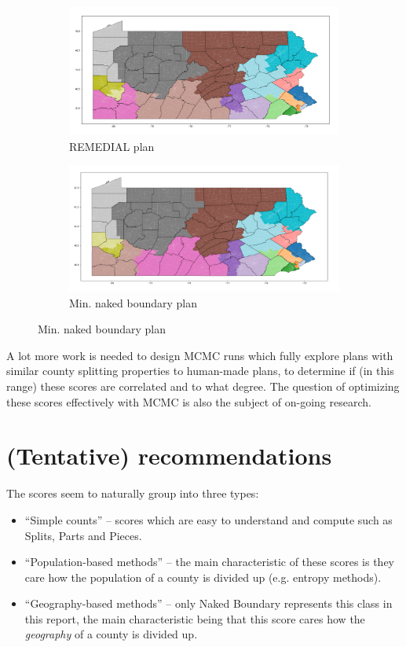 \documentclass{mgggarticle}
\begin{document}
\begin{figure}[h]
	\begin{subfigure}{\textwidth}
	        \includegraphics[width=\linewidth]{rem_init_bound.png}
	                 \caption{REMEDIAL plan}
	\end{subfigure}
	
	\begin{subfigure}{\textwidth}
        \includegraphics[width=\linewidth]{min_naked_bound.png} 
                 \caption{Min. naked boundary plan}

	\end{subfigure}
     
\end{figure}

A lot more work is needed to design MCMC runs which fully explore plans with similar county splitting properties to human-made plans, to determine if (in this range) these scores are correlated and to what degree. The question of optimizing these scores effectively with MCMC is also the subject of on-going research.



\section{(Tentative) recommendations}
The scores seem to naturally group into three types:
\begin{itemize}
\item ``Simple counts'' -- scores which are easy to understand and compute such as Splits, Parts and Pieces.
\item ``Population-based methods'' -- the main characteristic of these scores is they care how the population of a county is divided up (e.g. entropy methods).
\item ``Geography-based methods'' -- only Naked Boundary represents this class in this report, the main characteristic being that this score cares how the \emph{geography} of a county is divided up.
\end{itemize}
\end{document}
